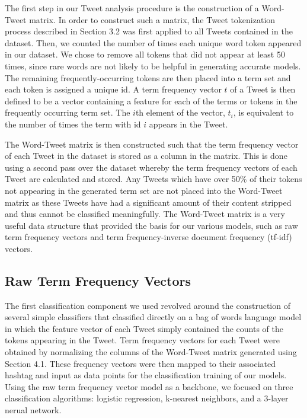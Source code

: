\documentclass[11pt]{article}
\begin{document}
The first step in our Tweet analysis procedure is the construction of a Word-Tweet matrix. In order to construct such a matrix, the Tweet tokenization process described in Section 3.2 was first applied to all Tweets contained in the dataset. Then, we counted the number of times each unique word token appeared in our dataset. We chose to remove all tokens that did not appear at least 50 times, since rare words are not likely to be helpful in generating accurate models. The remaining frequently-occurring tokens are then placed into a term set and each token is assigned a unique id. A term frequency vector $t$ of a Tweet is then defined to be a vector containing a feature for each of the terms or tokens in the frequently occurring term set. The $i$th element of the vector, $t_i$, is equivalent to the number of times the term with id $i$ appears in the Tweet.

The Word-Tweet matrix is then constructed such that the term frequency vector of each Tweet in the dataset is stored as a column in the matrix. This is done using a second pass over the dataset whereby the term frequency vectors of each Tweet are calculated and stored. Any Tweets which have over 50\% of their tokens not appearing in the generated term set are not placed into the Word-Tweet matrix as these Tweets have had a significant amount of their content stripped and thus cannot be classified meaningfully. The Word-Tweet matrix is a very useful data structure that provided the basis for our various models, such as raw term frequency vectors and term frequency-inverse document frequency (tf-idf) vectors.

\subsection{Raw Term Frequency Vectors}

The first classification component we used revolved around the construction of several simple classifiers that classified directly on a bag of words language model in which the feature vector of each Tweet simply contained the counts of the tokens appearing in the Tweet. Term frequency vectors for each Tweet were obtained by normalizing the columns of the Word-Tweet matrix generated using Section 4.1. These frequency vectors were then mapped to their associated hashtag and input as data points for the classification training of our models. Using the raw term frequency vector model as a backbone, we focused on three classification algorithms: logistic regression, k-nearest neighbors, and a 3-layer nerual network.
\end{document}
